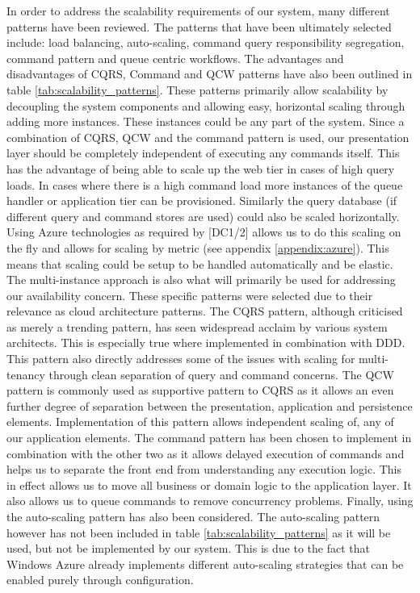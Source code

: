 In order to address the scalability requirements of our system, many different patterns have been reviewed. The patterns that have been ultimately selected include: load balancing, auto-scaling, command query responsibility segregation, command pattern and queue centric workflows. The advantages and disadvantages of CQRS, Command and QCW  patterns have also been outlined in table \ref{tab:scalability_patterns}. These patterns primarily allow scalability by decoupling the system components and allowing easy, horizontal scaling through adding more instances. These instances could be any part of the system. Since a combination of CQRS,  QCW and the command pattern  is used, our presentation layer should be completely independent of executing any commands itself. This has the advantage of being able to scale up the web tier in cases of high query loads. In cases where there is a high command load more instances of the queue handler or application tier can be provisioned. Similarly the query database (if different query and command stores are used) could also be scaled horizontally. Using Azure technologies as required by [DC1/2] allows us to do this scaling on the fly and allows for scaling by metric (see appendix \ref{appendix:azure}). This means that scaling could be setup to be handled automatically and be elastic. The multi-instance approach is also what will primarily be used for addressing our availability concern. These specific patterns were selected due to their relevance as cloud architecture patterns. The CQRS pattern, although criticised as merely a trending pattern, has seen widespread acclaim by various system architects. This is especially true where implemented in combination with DDD. This pattern also directly addresses some of the issues with scaling for multi-tenancy through clean separation of query and command concerns. The QCW pattern is commonly used as supportive pattern to CQRS as it allows an even further degree of separation between the presentation, application and persistence elements. Implementation of this pattern allows independent scaling of, any of our application elements. The command pattern has been chosen to implement in combination with the other two as it allows delayed execution of commands and helps us to separate the front end from understanding any execution logic. This in effect allows us to move all business or domain logic to the application layer. It also allows us to queue commands to remove concurrency problems. Finally, using the auto-scaling pattern has also been considered. The auto-scaling pattern however has not been included in table \ref{tab:scalability_patterns} as it will be used, but not be implemented by our system. This is due to the fact that Windows Azure already implements different auto-scaling strategies that can be enabled purely through configuration.  


